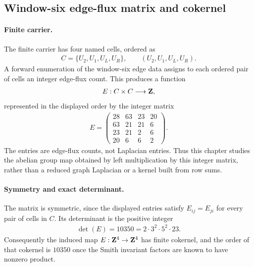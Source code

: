 
\subsection{Window-six edge-flux matrix and cokernel}
\label{sec:window6-edge-matrix-smith-normal-form-cokernel}

\paragraph{Finite carrier.}
The finite carrier has four named cells, ordered as
$$
\begin{aligned}
C=\{U_2,U_1,U_L,U_R\}, \qquad (U_2,U_1,U_L,U_R).
\end{aligned}
$$
A forward enumeration of the window-six edge data assigns to each ordered pair of cells an integer edge-flux count.  This produces a function
$$
\begin{aligned}
E:C\times C\longrightarrow {\bf Z},
\end{aligned}
$$
represented in the displayed order by the integer matrix
$$
\begin{aligned}
E=
\left(\begin{array}{rrrr}
28&63&23&20\\
63&21&21&6\\
23&21&2&6\\
20&6&6&2
\end{array}\right).
\end{aligned}
$$
The entries are edge-flux counts, not Laplacian entries.  Thus this chapter studies the abelian group map obtained by left multiplication by this integer matrix, rather than a reduced graph Laplacian or a kernel built from row sums.

\paragraph{Symmetry and exact determinant.}
The matrix is symmetric, since the displayed entries satisfy $E_{ij}=E_{ji}$ for every pair of cells in $C$.  Its determinant is the positive integer
$$
\begin{aligned}
\det(E)=10350=2\cdot 3^2\cdot 5^2\cdot 23.
\end{aligned}
$$
Consequently the induced map $E:{\bf Z}^4\to {\bf Z}^4$ has finite cokernel, and the order of that cokernel is $10350$ once the Smith invariant factors are known to have nonzero product.

